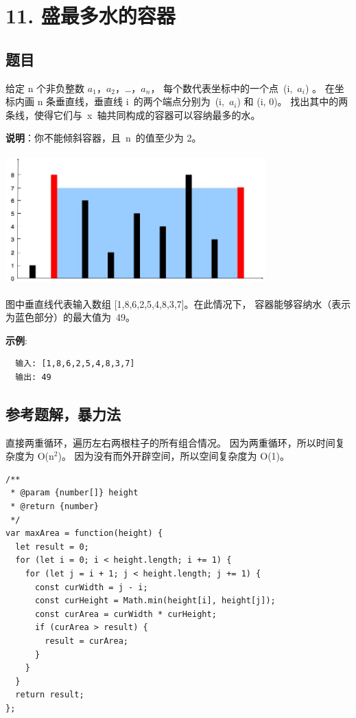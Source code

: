 \newpage
\section{11. 盛最多水的容器}
\label{leetcode:11}

\subsection{题目}

给定 n 个非负整数 $a_{1}$，$a_{2}$，\ldots，$a_{n}$，
每个数代表坐标中的一个点 (i, $a_{i}$) 。
在坐标内画 n 条垂直线，垂直线 i 的两个端点分别为 (i, $a_{i}$) 和 (i, 0)。
找出其中的两条线，使得它们与 x 轴共同构成的容器可以容纳最多的水。

\textbf{说明}：你不能倾斜容器，且 n 的值至少为 2。

\includegraphics[width=100mm,height=50mm]{images/leetcode/question_11.jpg}

图中垂直线代表输入数组 [1,8,6,2,5,4,8,3,7]。在此情况下，
容器能够容纳水（表示为蓝色部分）的最大值为 49。

\textbf{示例}:

\begin{verbatim}
  输入: [1,8,6,2,5,4,8,3,7]
  输出: 49
\end{verbatim}

\subsection{参考题解，暴力法}

直接两重循环，遍历左右两根柱子的所有组合情况。
因为两重循环，所以时间复杂度为 O(n$^{2}$)。
因为没有而外开辟空间，所以空间复杂度为 O(1)。

\begin{verbatim}
/**
 * @param {number[]} height
 * @return {number}
 */
var maxArea = function(height) {
  let result = 0;
  for (let i = 0; i < height.length; i += 1) {
    for (let j = i + 1; j < height.length; j += 1) {
      const curWidth = j - i;
      const curHeight = Math.min(height[i], height[j]);
      const curArea = curWidth * curHeight;
      if (curArea > result) {
        result = curArea;
      }
    }
  }
  return result;
};
\end{verbatim}

